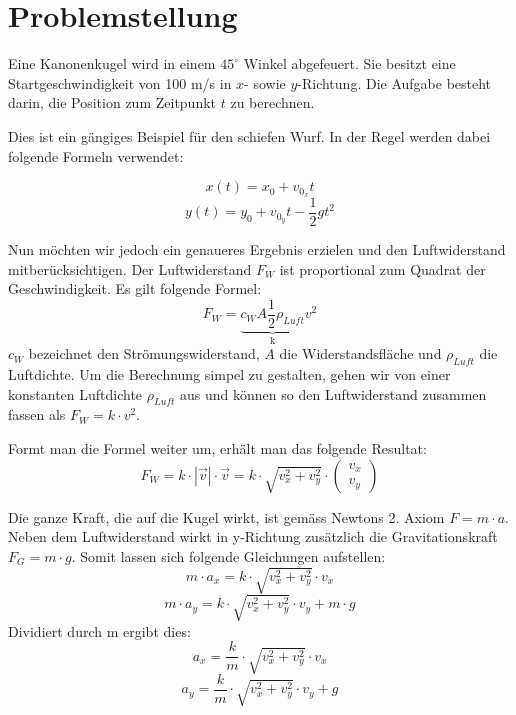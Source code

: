 \section{Problemstellung
\label{perturbation:section:problemstellung}}
Eine Kanonenkugel wird in einem $45^{\circ}$ Winkel abgefeuert. 
Sie besitzt eine Startgeschwindigkeit von 100 m/s in $x$- sowie $y$-Richtung. 
Die Aufgabe besteht darin, die Position zum Zeitpunkt $t$ zu berechnen.

Dies ist ein gängiges Beispiel für den schiefen Wurf. 
In der Regel werden dabei folgende Formeln verwendet:

\begin{equation}\label{eq:x_simple}
    x(t) = x_0 + v_{0_x}t
\end{equation}
\begin{equation}\label{eq:y_simple}
    y(t) = y_0 + v_{0_y}t - \frac{1}{2}gt^2
\end{equation}


Nun möchten wir jedoch ein genaueres Ergebnis erzielen und den Luftwiderstand mitberücksichtigen.  
Der Luftwiderstand $F_W$ ist proportional zum Quadrat der Geschwindigkeit. Es gilt folgende Formel:
\[
F_W = \underbrace{c_WA\frac{1}{2}\rho_{Luft}}_\text{k}v^2
\]
$c_W$ bezeichnet den Strömungswiderstand, $A$ die Widerstandsfläche und $\rho_{Luft}$ die Luftdichte. 
Um die Berechnung simpel zu gestalten, gehen wir von einer konstanten Luftdichte $\rho_{Luft}$ aus und können so den Luftwiderstand zusammen fassen als $F_W = k \cdot v^2$.

Formt man die Formel weiter um, erhält man das folgende Resultat:
\[
F_W = k \cdot |\vec{v}| \cdot \vec{v} = k \cdot \sqrt{v_x^2 + v_y^2} \cdot \begin{pmatrix}v_x\\v_y\end{pmatrix}
\]

Die ganze Kraft, die auf die Kugel wirkt, ist gemäss Newtons 2. Axiom $F = m \cdot a$. 
Neben dem Luftwiderstand wirkt in y-Richtung zusätzlich die Gravitationskraft $F_G = m \cdot g$. 
Somit lassen sich folgende Gleichungen aufstellen:
\[
m \cdot a_x = k \cdot \sqrt{v_x^2 + v_y^2} \cdot v_x
\]
\[
m \cdot a_y = k \cdot \sqrt{v_x^2 + v_y^2} \cdot v_y + m \cdot g
\]
Dividiert durch m ergibt dies:
\[
a_x = \frac{k}{m} \cdot \sqrt{v_x^2 + v_y^2} \cdot v_x
\]
\[
a_y = \frac{k}{m} \cdot \sqrt{v_x^2 + v_y^2} \cdot v_y + g
\]

